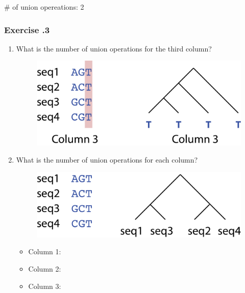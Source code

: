 \# of union opereations: 2

%
%
\subsubsection*{Exercise \thesection.3}
\begin{enumerate}
\item What is the number of union operations for the third column?
\begin{figure}[H]
  \centering
      \includegraphics[width=0.4 \textwidth]{fig09/mp_exercise_1.png}
\end{figure}

\item What is the number of union operations for each column?
\begin{figure}[H]
  \centering
      \includegraphics[width=0.4 \textwidth]{fig09/mp_exercise_2.png}
\end{figure}

\begin{itemize}
\item Column 1:
\item Column 2:
\item Column 3:
\end{itemize}

\end{enumerate}

\bigskip 

%
